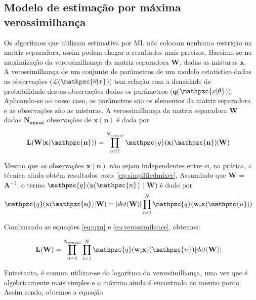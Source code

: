 \subsection{Modelo de estimação por máxima verossimilhança}

Os algoritmos que utilizam estimativa por ML não colocam nenhuma restrição na matriz separadora, assim podem chegar a resultados mais precisos. Baseiam-se na maximização da verossimilhança da matriz separadora $\mathbf{W}$, dadas as misturas $\mathbf{x}$. A verossimilhança de um conjunto de parâmetros de um modelo estatístico dadas as observações ($\mathcal{L}$($\mathpzc{\theta | x}$)) tem relação com a densidade de probabilidade destas observações dados os parâmetros ($\mathbf{q}$($\mathpzc{x | \theta}$)). Aplicando-se ao nosso caso, os parâmetros são os elementos da matriz separadora e as observações são as misturas. A verossimilhança da matriz separadora $\mathbf{W}$ dadas $\mathbf{N_{amost}}$ observações de $\mathbf{x(n)}$ é dada por

    \begin{equation}
        \label{eq:verossimilance}
        \mathbf{L(W | x(\mathpzc{n}))} = \prod_{n=1}^{N_{amost}} \mathpzc{q}(\mathbf{x(\mathpzc{n})} | \mathbf{W})
    \end{equation}

    Mesmo que as observações $\mathbf{x(n)}$ não sejam independentes entre si, na prática, a técnica ainda obtém resultados razo: \ref{eq:simplifiedmixer}, Assumindo que $\mathbf{W}$ = $\mathbf{A^{-1}}$, o termo $\mathpzc{q}$($\mathbf{x}$($\mathpzc{n}$) $|$ $\mathbf{W}$) é dado por 
    \begin{equation} \label{eq:qxn}
        \mathpzc{q}(\mathbf{x(\mathpzc{n})} | \mathbf{W}) = |det(\mathbf{W})|\prod_{i=1}^N\mathpzc{q}(\mathbf{w_ix}(\mathpzc{n}))
    \end{equation}
    
    Combinando as equações \ref{eq:qxn} e \ref{eq:verossimilance}, obtemos:
    
    \begin{equation}
        \label{eq:LW}
        \mathbf{L(W)} = \prod_{n=1}^{N_{amost}}\prod_{i=1}^N\mathpzc{q}(\mathbf{w_ix})(\mathpzc{n})|det(\mathbf{W})|
    \end{equation}
    
    Entretanto, é comum utilizar-se do logaritmo da verossimilhança, uma vez que é algebricamente mais simples e o máximo ainda é encontrado no mesmo ponto. Assim sendo, obtemos a equação
    
